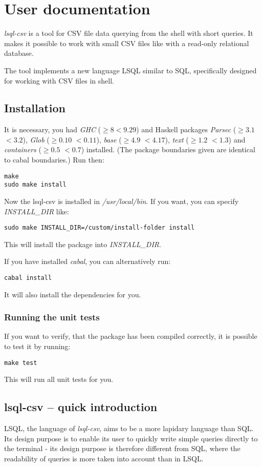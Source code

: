 \chapter{User documentation}
\textit{lsql-csv} is a tool for CSV file data querying from the shell with short queries. It makes it possible to work with small CSV files like with a read-only relational database.

The tool implements a new language LSQL similar to SQL, specifically designed for working with CSV files in shell. 

\section{Installation}
It is necessary, you had \textit{GHC} ($\geq 8 <9.29$) and Haskell packages \textit{Parsec} ($\geq 3.1$ $<3.2$), \textit{Glob} ($\geq 0.10$ $<0.11$), 
\textit{base} ($\geq 4.9$ $<4.17$), \textit{text} ($\geq 1.2$ $<1.3$) and \textit{containers} ($\geq 0.5$ $<0.7$)
 installed. (The package boundaries given are identical to cabal boundaries.) Run then:

\begin{verbatim}
make
sudo make install
\end{verbatim}

Now the lsql-csv is installed in \textit{/usr/local/bin}. If you want, you can specify \textit{INSTALL\_DIR} like:
\begin{verbatim}
sudo make INSTALL_DIR=/custom/install-folder install
\end{verbatim}
This will install the package into \textit{INSTALL\_DIR}.

If you have installed \textit{cabal}, you can alternatively run:
\begin{verbatim}
cabal install
\end{verbatim}
It will also install the dependencies for you.

\subsection{Running the unit tests}
If you want to verify, that the package has been compiled correctly, it is possible to test it by running:
\begin{verbatim}
make test
\end{verbatim}
This will run all unit tests for you.

\section{lsql-csv -- quick introduction}
LSQL, the language of \textit{lsql-csv}, aims to be a more lapidary language than SQL. Its design purpose is to enable its user to quickly write simple queries directly to the terminal - its design purpose is therefore different from SQL, where the readability of queries is more taken into account than in LSQL.

